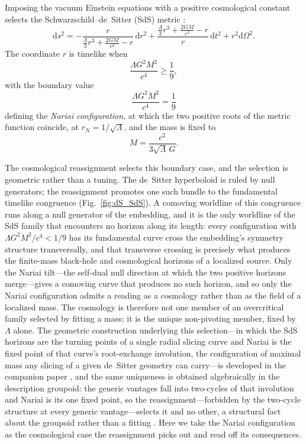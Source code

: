 \documentclass[11pt,a4paper]{article}
\theoremstyle{plain}
\theoremstyle{definition}
\theoremstyle{remark}
\begin{document}
Imposing the vacuum Einstein equations with a positive cosmological constant selects the Schwarzschild--de~Sitter (SdS) metric \cite{Kottler1918}:
\begin{equation}
    \mathrm{d}s^2
    =-\frac{r}{\frac{\Lambda}{3}r^3+\frac{2GM}{c^2}-r}\,\mathrm{d}r^2
    +\frac{\frac{\Lambda}{3}r^3+\frac{2GM}{c^2}-r}{r}\,\mathrm{d}t^2
    +r^2\mathrm{d}\Omega^2.
    \label{eq:SdS-static}
\end{equation}
The coordinate $r$ is timelike when
\begin{equation}
    \frac{\Lambda G^2 M^2}{c^4}\geq\frac{1}{9},
    \label{eq:SdS-cosmology-condition}
\end{equation}
with the boundary value
\begin{equation}
    \frac{\Lambda G^2 M^2}{c^4}=\frac{1}{9}
    \label{eq:Nariai-condition}
\end{equation}
defining the \emph{Nariai configuration}, at which the two positive roots of the metric function coincide, at $r_{N}=1/\sqrt{\Lambda}$, and the mass is fixed to
\begin{equation}
    M=\frac{c^2}{3\sqrt{\Lambda}\,G}.
    \label{eq:Nariai-mass}
\end{equation}

The cosmological reassignment selects this boundary case, and the selection is geometric rather than a tuning. The de~Sitter hyperboloid is ruled by null generators; the reassignment promotes one such bundle to the fundamental timelike congruence (Fig.~\ref{fig:dS_SdS}). A comoving worldline of this congruence runs along a null generator of the embedding, and it is the only worldline of the SdS family that encounters no horizon along its length: every configuration with $\Lambda G^2M^2/c^4<1/9$ has its fundamental curve cross the embedding's symmetry structure transversally, and that transverse crossing is precisely what produces the finite-mass black-hole and cosmological horizons of a localized source. Only the Nariai tilt---the self-dual null direction at which the two positive horizons merge---gives a comoving curve that produces no such horizon, and so only the Nariai configuration admits a reading as a cosmology rather than as the field of a localized mass. The cosmology is therefore not one member of an overcritical family selected by fitting a mass; it is the unique non-pivoting member, fixed by $\Lambda$ alone. The geometric construction underlying this selection---in which the SdS horizons are the turning points of a single radial slicing curve and Nariai is the fixed point of that curve's root-exchange involution, the configuration of maximal mass any slicing of a given de~Sitter geometry can carry---is developed in the companion paper \cite{JanzenSlicing}, and the same uniqueness is obtained algebraically in the description groupoid: the generic vantages fall into two-cycles of that involution and Nariai is its one fixed point, so the reassignment---forbidden by the two-cycle structure at every generic vantage---selects it and no other, a structural fact about the groupoid rather than a fitting \cite{JanzenGroupoid}. Here we take the Nariai configuration as the cosmological case the reassignment picks out and read off its consequences.
\end{document}

